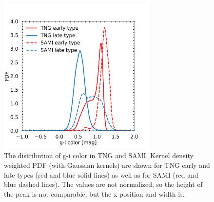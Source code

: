 \begin{figure}
    \centering
    \includegraphics[width=0.7\textwidth]{images/results_pdf_g_i_band.png}
    \caption{The distribution of g-i color in TNG and SAMI. Kernel density weighted PDF (with Gaussian kernels) are shown for TNG early and late types (red and blue solid lines) as well as for SAMI (red and blue dashed lines). The values are not normalized, so the height of the peak is not comparable, but the x-position and width is.}
    \label{pdf_color}
\end{figure}

